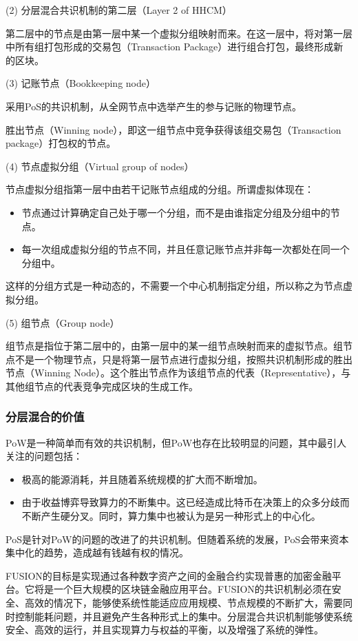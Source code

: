 \documentclass[a4paper,12pt]{article}
\begin{document}
(2) 分层混合共识机制的第二层（Layer 2 of HHCM）

第二层中的节点是由第一层中某一个虚拟分组映射而来。在这一层中，将对第一层中所有组打包形成的交易包（Transaction Package）进行组合打包，最终形成新的区块。

(3) 记账节点（Bookkeeping node）

采用PoS的共识机制，从全网节点中选举产生的参与记账的物理节点。

胜出节点（Winning node），即这一组节点中竞争获得该组交易包（Transaction package）打包权的节点。

(4) 节点虚拟分组（Virtual group of nodes）

节点虚拟分组指第一层中由若干记账节点组成的分组。所谓虚拟体现在：

\begin{itemize}[itemindent=1em]
	\item 节点通过计算确定自己处于哪一个分组，而不是由谁指定分组及分组中的节点。
	\item 每一次组成虚拟分组的节点不同，并且任意记账节点并非每一次都处在同一个分组中。
\end{itemize}

这样的分组方式是一种动态的，不需要一个中心机制指定分组，所以称之为节点虚拟分组。

(5) 组节点（Group node）

组节点是指位于第二层中的，由第一层中的某一组节点映射而来的虚拟节点。组节点不是一个物理节点，只是将第一层节点进行虚拟分组，按照共识机制形成的胜出节点（Winning Node）。这个胜出节点作为该组节点的代表（Representative），与其他组节点的代表竞争完成区块的生成工作。

\subsubsection{分层混合的价值}

PoW是一种简单而有效的共识机制，但PoW也存在比较明显的问题，其中最引人关注的问题包括：
\begin{itemize}[itemindent=1em]
	\item 极高的能源消耗，并且随着系统规模的扩大而不断增加。
	\item 由于收益博弈导致算力的不断集中。这已经造成比特币在决策上的众多分歧而不断产生硬分叉。同时，算力集中也被认为是另一种形式上的中心化。
\end{itemize}

PoS是针对PoW的问题的改进了的共识机制。但随着系统的发展，PoS会带来资本集中化的趋势，造成越有钱越有权的情况。

FUSION的目标是实现通过各种数字资产之间的金融合约实现普惠的加密金融平台。它将是一个巨大规模的区块链金融应用平台。FUSION的共识机制必须在安全、高效的情况下，能够使系统性能适应应用规模、节点规模的不断扩大，需要同时控制能耗问题，并且避免产生各种形式上的集中。分层混合共识机制能够使系统安全、高效的运行，并且实现算力与权益的平衡，以及增强了系统的弹性。
\end{document}

